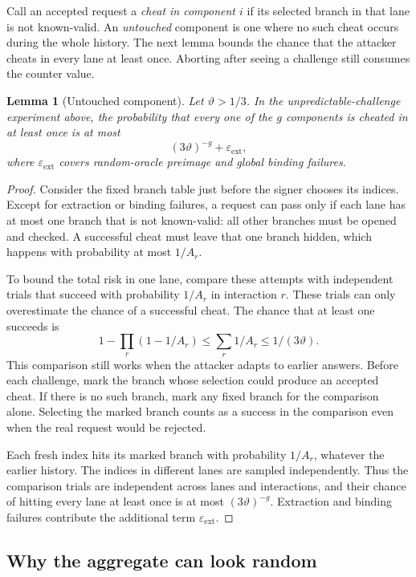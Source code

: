 \documentclass[10pt]{article}
\newtheorem{lemma}{Lemma}
\begin{document}
Call an accepted request a \emph{cheat in component $i$} if its selected
branch in that lane is not known-valid.  An \emph{untouched} component is
one where no such cheat occurs during the whole history.  The next lemma
bounds the chance that the attacker cheats in every lane at least once.
Aborting after seeing a challenge still consumes the counter value.

\begin{lemma}[Untouched component]
Let $\vartheta>1/3$.  In the
unpredictable-challenge experiment above, the probability that every one of
the $g$ components is cheated in at least once is at most
\[
 (3\vartheta)^{-g}+\varepsilon_{\mathrm{ext}},
\]
where $\varepsilon_{\mathrm{ext}}$ covers random-oracle preimage and global
binding failures.
\end{lemma}

\begin{proof}
Consider the fixed branch table just before the signer chooses its indices.
Except for extraction or binding failures, a request can pass only if each
lane has at most one branch that is not known-valid: all other branches must
be opened and checked.  A successful cheat must leave that one branch hidden,
which happens with probability at most $1/A_r$.

To bound the total risk in one lane, compare these attempts with independent
trials that succeed with probability $1/A_r$ in interaction $r$.  These
trials can only overestimate the chance of a successful cheat.  The chance
that at least one succeeds is
\[
 1-\prod_r(1-1/A_r)\leq\sum_r1/A_r\leq1/(3\vartheta).
\]
This comparison still works when the attacker adapts to earlier answers.
Before each challenge, mark the branch whose selection could produce an
accepted cheat.  If there is no such branch, mark any fixed branch for the
comparison alone.  Selecting the marked branch counts as a success in the
comparison even when the real request would be rejected.

Each fresh index hits its marked branch with probability $1/A_r$, whatever
the earlier history.  The indices in different lanes are sampled
independently.  Thus the comparison trials are independent across lanes and
interactions, and their chance of hitting every lane at least once is at
most $(3\vartheta)^{-g}$.  Extraction and binding failures contribute the
additional term $\varepsilon_{\mathrm{ext}}$.
\end{proof}

\subsection{Why the aggregate can look random}
\end{document}

